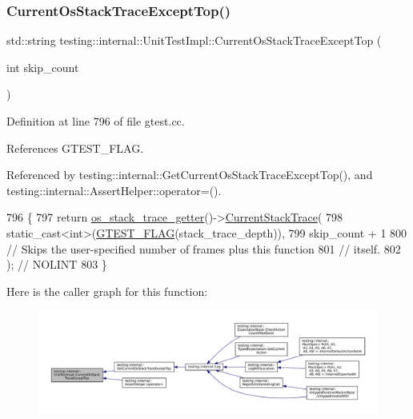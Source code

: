 \subsubsection{\texorpdfstring{Current\+Os\+Stack\+Trace\+Except\+Top()}{CurrentOsStackTraceExceptTop()}}
{\footnotesize\ttfamily std\+::string testing\+::internal\+::\+Unit\+Test\+Impl\+::\+Current\+Os\+Stack\+Trace\+Except\+Top (\begin{DoxyParamCaption}\item[{int}]{skip\+\_\+count }\end{DoxyParamCaption})}



Definition at line 796 of file gtest.\+cc.



References G\+T\+E\+S\+T\+\_\+\+F\+L\+AG.



Referenced by testing\+::internal\+::\+Get\+Current\+Os\+Stack\+Trace\+Except\+Top(), and testing\+::internal\+::\+Assert\+Helper\+::operator=().


\begin{DoxyCode}
796                                                                    \{
797   \textcolor{keywordflow}{return} \hyperlink{classtesting_1_1internal_1_1UnitTestImpl_a71753679854f7fbba6c1568eb422fecb}{os\_stack\_trace\_getter}()->\hyperlink{classtesting_1_1internal_1_1OsStackTraceGetterInterface_a6965eadb9b340808718fab9f1475c49a}{CurrentStackTrace}(
798       static\_cast<int>(\hyperlink{gtest-port_8h_a828f4e34a1c4b510da50ec1563e3562a}{GTEST\_FLAG}(stack\_trace\_depth)),
799       skip\_count + 1
800       \textcolor{comment}{// Skips the user-specified number of frames plus this function}
801       \textcolor{comment}{// itself.}
802       );  \textcolor{comment}{// NOLINT}
803 \}
\end{DoxyCode}
Here is the caller graph for this function\+:
\nopagebreak
\begin{figure}[H]
\begin{center}
\leavevmode
\includegraphics[width=350pt]{classtesting_1_1internal_1_1UnitTestImpl_a61c0a51ac4e57d9f884f646ca6dd2210_icgraph}
\end{center}
\end{figure}
\mbox{\label{classtesting_1_1internal_1_1UnitTestImpl_a0c18b2a9cb240722b1e38a3530aa2269}} 
